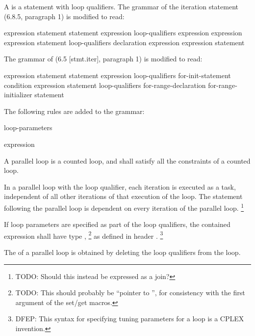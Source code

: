
\pnum
A
is a
statement with loop qualifiers.
The grammar of the iteration statement (6.8.5, paragraph 1)
is modified to read:

\begin{bnf}
\br
{} \terminal{(} expression \terminal{)} statement
\br
{} statement  \terminal{(} expression \terminal{)} \terminal{;}
\br
loop-qualifiers\opt{}  \terminal{(}
expression\opt{} \terminal{;}
expression\opt{} \terminal{;}
expression\opt{} \terminal{)} statement
\br
loop-qualifiers\opt{}  \terminal{(}
declaration
expression\opt{} \terminal{;}
expression\opt{} \terminal{)} statement
\end{bnf}

\begin{cpp}
The grammar of
(6.5 [stmt.iter], paragraph 1)
is modified to read:

\begin{bnf}
\br
{} \terminal{(} expression \terminal{)} statement
\br
{} statement  \terminal{(} expression \terminal{)} \terminal{;}
\br
loop-qualifiers\opt{}  \terminal{(}
for-init-statement
condition\opt{} \terminal{;}
expression\opt{} \terminal{)} statement
\br
loop-qualifiers\opt{}  \terminal{(}
for-range-declaration \terminal{:}
for-range-initializer \terminal{)} statement
\end{bnf}

\end{cpp}

\pnum
The following rules are added to the grammar:

\begin{bnf}
\br
{} loop-parameters\opt
\end{bnf}

\begin{bnf}
\br
\terminal{[} expression \terminal{]}
\end{bnf}

\pnum
A parallel loop is a counted loop,
and shall satisfy all the constraints of a counted loop.

\pnum
In a parallel loop with the
loop qualifier,
each iteration is
executed as a task, independent of
all other iterations of that execution of the loop.
The statement following the parallel loop
is dependent on every iteration of the parallel loop.
\footnote{TODO:
Should this instead be expressed as a join?
}

\pnum
If loop parameters are specified as part of the loop qualifiers,
the contained expression shall have type
,%
\footnote{TODO:
This should probably be
``pointer to '',
for consistency with the first argument of the set/get macros.
}
as defined in header
.%
\footnote{DFEP:
This syntax for specifying tuning parameters for a loop
is a CPLEX invention.
}

\pnum
The
of a parallel loop
is obtained by deleting the loop qualifiers from the loop.